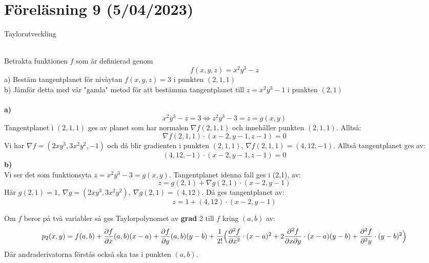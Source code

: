 \documentclass{report}
\begin{document}
\pagebreak
\section{Föreläsning 9 (5/04/2023)}
Taylorutveckling\\\\

\ex{}
{
Betrakta funktionen $ f $ som är definierad genom
\begin{equation*}
f(x,y,z) = x^2y^3-z 
\end{equation*}
a) Bestäm tangentplanet för nivåytan $ f(x,y,z) = 3 $ i punkten $ (2,1,1) $\\
b) Jämför detta med vår "gamla" metod för att bestämma tangentplanet till $ z = x^2y^3-1 $ i punkten $ (2,1) $\\\\

\textbf{a)}\\
\begin{equation*}
x^2y^3-z = 3 \iff z^2y^3-3 = z = g(x,y)
\end{equation*}
Tangentplanet i $ (2,1,1) $ ges av planet som har normalen $ \nabla f(2,1,1) $ och innehåller punkten $ (2,1,1) $. Alltså:
\begin{equation*}
\nabla f(2,1,1) \cdot (x-2,y-1,z-1) = 0
\end{equation*}
Vi har $ \nabla f = (2xy^3, 3x^2y^2, -1) $ och då blir gradienten i punkten $ (2,1,1) $, $ \nabla f(2,1,1) = (4,12,-1) $. Alltså tangentplanet ges av:
\begin{equation*}
	(4,12,-1) \cdot (x-2,y-1,z-1) = 0
\end{equation*}
\textbf{b)}\\
Vi ser det som funktionsyta $ z = x^2y^3-3 = g(x,y) $. Tangentplanet idenna fall ges i (2,1), av:
\begin{equation*}
z = g(2,1) + \nabla g(2,1) \cdot (x-2,y-1)
\end{equation*}
Här $ g(2,1) = 1, \: \nabla g = (2xy^3, 3x^2y^2), \: \nabla g(2,1) = (4,12) $. Då ges tangentplanet av:
\begin{equation*}
z = 1 + (4,12) \cdot (x-2,y-1)
\end{equation*}

}

{
Om $ f $ beror på två variabler så ges Taylorpolynomet av \textbf{grad} 2 till $ f $ kring $ (a,b) $ av:
\begin{equation*}
p_2(x,y) = f(a,b) + \frac{\partial f }{\partial x } (a,b)(x-a) + \frac{\partial f }{\partial y } (a,b)(y-b) + \frac{1}{2!} \Bigl( \frac{\partial^2 f }{\partial x^2 } \cdot (x-a)^2 + 2 \frac{\partial^2f }{\partial x \partial y } \cdot (x-a)(y-b) + \frac{\partial^2 f }{\partial^2 y } \cdot (y-b)^2\Bigr)
\end{equation*}
Där andraderivatorna förstås också ska tas i punkten $ (a,b) $.
}
\end{document}
